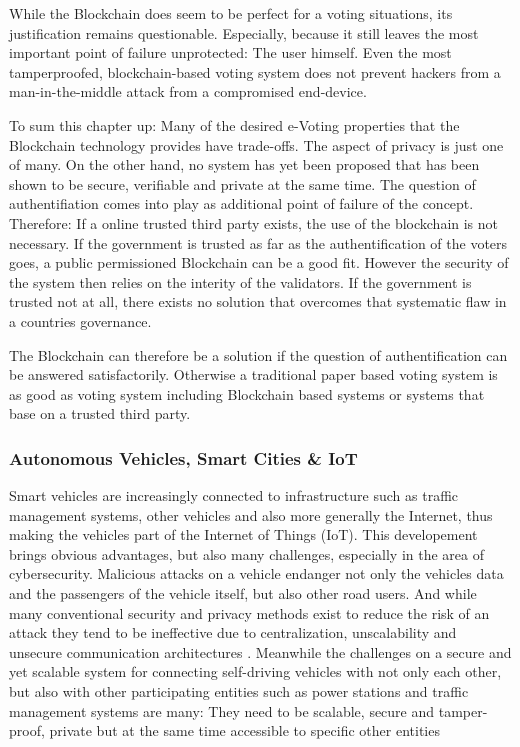While the Blockchain does seem to be perfect for a voting situations, its justification remains questionable. Especially, because it still leaves the most important point of failure unprotected: The user himself. Even the most tamperproofed, blockchain-based voting system does not prevent hackers from a man-in-the-middle attack from a compromised end-device. 

To sum this chapter up: Many of the desired e-Voting properties that the Blockchain technology provides have trade-offs. The aspect of privacy is just one of many. On the other hand, no system has yet been proposed that has been shown to be secure, verifiable and private at the same time. The question of authentifiation comes into play as additional point of failure of the concept.
Therefore: If a online trusted third party exists, the use of the blockchain is not necessary. If the government is trusted as far as the authentification of the voters goes, a public permissioned Blockchain can be a good fit. However the security of the system then relies on the interity of the validators. 
If the government is trusted not at all, there exists no solution that overcomes that systematic flaw in a countries governance.

The Blockchain can therefore be a solution if the question of authentification can be answered satisfactorily. Otherwise a traditional paper based voting system is as good as voting system including Blockchain based systems or systems that base on a trusted third party.

\subsubsection{Autonomous Vehicles, Smart Cities \& IoT}
Smart vehicles are increasingly connected to infrastructure such as traffic management systems, other vehicles and also more generally the Internet, thus making the vehicles part of the Internet of Things (IoT). This developement brings obvious advantages, but also many challenges, especially in the area of cybersecurity. Malicious attacks on a vehicle endanger not only the vehicles data and the passengers of the vehicle itself, but also other road users. And while many conventional security and privacy methods exist to reduce the risk of an attack they tend to be ineffective due to centralization, unscalability and unsecure communication architectures \cite{DorriSteger2017}.
Meanwhile the challenges on a secure and yet scalable system for connecting self-driving vehicles with not only each other, but also with other participating entities such as power stations and traffic management systems are many: They need to be scalable, secure and tamper-proof, private but at the same time accessible to specific other entities

